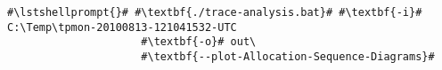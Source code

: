 \begin{lstlisting}[caption=Command to produce a sequence diagram,label=lst:traceAnalysis:sequenceDiagram]
#\lstshellprompt{}# #\textbf{./trace-analysis.bat}# #\textbf{-i}# C:\Temp\tpmon-20100813-121041532-UTC
                     #\textbf{-o}# out\
                     #\textbf{--plot-Allocation-Sequence-Diagrams}#		  
\end{lstlisting}
